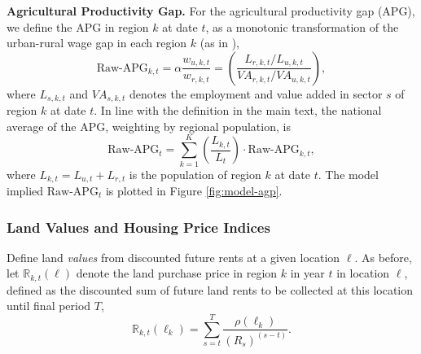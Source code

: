 \documentclass[11pt]{report}
\begin{document}
\textbf{Agricultural Productivity Gap.} For the agricultural productivity gap (APG), we define the APG in region $k$ at date $t$, as a monotonic transformation of the urban-rural wage gap in each region $k$ (as in \cite{gollin2014agricultural}),
\begin{equation*}
\text{Raw-APG}_ {k,t}= \alpha\frac{w_{u,k,t}}{w_{r,k,t}} = \left( \frac{L_{r,k,t}/L_{u,k,t}}{VA_{r,k,t}/VA_{u,k,t}}\right),
\end{equation*}
where $L_{s,k,t }$ and $VA_{s,k,t}$ denotes the employment and value added in sector $s$ of region $k$ at date $t$.
In line with the definition in the main text, the national average of the APG, weighting by regional population, is 
\begin{equation*}
	\text{Raw-APG}_t=\sum_{k=1}^{K}\left( \frac{L_{k,t}}{L_t}\right) \cdot \text{Raw-APG}_{k,t},
\end{equation*}
where $L_{k,t}=L_{u,t}+L_{r,t}$ is the population of region $k$ at date $t$. The model implied $\text{Raw-APG}_t$ is plotted in Figure \ref{fig:model-agp}.


\subsubsection{Land Values and Housing Price Indices}\label{B-sec:values-prices-model}

Define land \emph{values} from discounted future rents at a given location $\ell$. As before, let $\mathbb{R}_{k,t}(\ell)$ denote the land purchase price in region $k$ in year $t$ in location $\ell$, defined as the discounted sum of future land rents to be collected at this location until final period $T$, 
\begin{equation*}
\mathbb{R}_{k,t}(\ell_k) = \sum_{s=t}^T \frac{\rho(\ell_k)}{(R_s)^{(s-t)}}.
\end{equation*}
\end{document}
